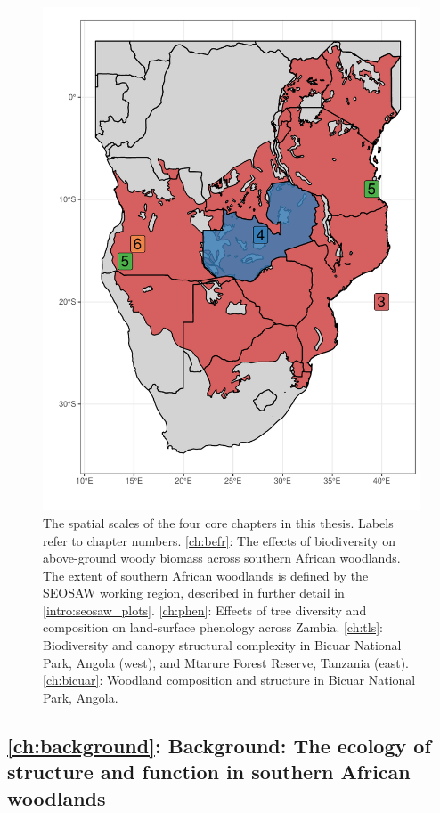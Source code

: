 \begin{refsection}
\begin{figure}
	\includegraphics[width=0.8\linewidth]{img/thesis_map}
	\caption[Map of thesis study locations]{The spatial scales of the four core chapters in this thesis. Labels refer to chapter numbers. \autoref{ch:befr}: The effects of biodiversity on above-ground woody biomass across southern African woodlands. The extent of southern African woodlands is defined by the SEOSAW working region, described in further detail in \autoref{intro:seosaw_plots}. \autoref{ch:phen}: Effects of tree diversity and composition on land-surface phenology across Zambia. \autoref{ch:tls}: Biodiversity and canopy structural complexity in Bicuar National Park, Angola (west), and Mtarure Forest Reserve, Tanzania (east). \autoref{ch:bicuar}: Woodland composition and structure in Bicuar National Park, Angola.}
	\label{intro:thesis_map}
\end{figure}

\subsection{\autoref{ch:background}: Background: The ecology of structure and function in southern African woodlands}
\label{intro:ssec:ch:background}


\end{refsection}
